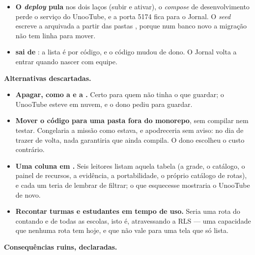 \begin{itemize}
    grade, última versão, a fotografia, o motivo e a data. O documento de
    portabilidade também lê , para a participação
    da criança continuar nomeada.
  \item \textbf{O \emph{deploy} pula } nos dois laços (subir e
    ativar), o \emph{compose} de desenvolvimento perde o serviço do UnooTube, e
    a porta 5174 fica para o Jornal. O \emph{seed} escreve a arquivada a partir
    das pastas , porque num banco novo a migração não tem linha
    para mover.
  \item \textbf{ sai de }: a lista é
    por código, e o código mudou de dono. O Jornal volta a entrar quando nascer
    com equipe.
\end{itemize}

\textbf{Alternativas descartadas.}

\begin{itemize}
  \item \textbf{Apagar, como a  e a .} Certo para
    quem não tinha o que guardar; o UnooTube esteve em nuvem, e o dono pediu
    para guardar.
  \item \textbf{Mover o código para uma pasta fora do monorepo}, sem compilar
    nem testar. Congelaria a missão como estava, e apodreceria sem aviso: no dia
    de trazer de volta, nada garantiria que ainda compila. O dono escolheu o
    custo contrário.
  \item \textbf{Uma coluna  em .} Seis
    leitores listam aquela tabela (a grade, o catálogo, o painel de recursos, a
    evidência, a portabilidade, o próprio catálogo de rotas), e cada um teria de
    lembrar de filtrar; o que esquecesse mostraria o UnooTube de novo.
  \item \textbf{Recontar turmas e estudantes em tempo de uso.} Seria uma rota
    do  contando  e  de todas as escolas,
    isto é, atravessando a RLS --- uma capacidade que nenhuma rota tem hoje, e
    que não vale para uma tela que só lista.
\end{itemize}

\textbf{Consequências ruins, declaradas.}

